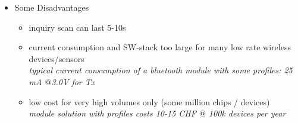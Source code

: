 \begin{itemize}
\begin{itemize}
	\end{itemize}
	\item Some Disadvantages
	\begin{itemize}
		\item inquiry scan can last 5-10s 
		\item current consumption and SW-stack too large for many low rate wireless devices/sensors \\
		\textit{typical current consumption of a bluetooth module with some profiles: 25 mA $@$3.0V for Tx}
		\item low cost for very high volumes only (some million chips / devices)  \\
		\textit{module solution with profiles costs 10-15 CHF $@$ 100k devices per year}
	\end{itemize}
\end{itemize}

